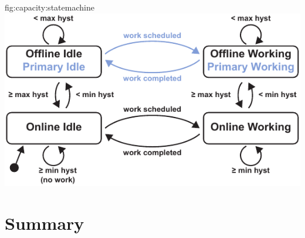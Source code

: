 \begin{definefigure}{fig:capacity:statemachine}
    \centering
    \includegraphics[width=\columnwidth]{figs/capacity/model_state_machine}
    \caption{\normalfont Model state machine.
    A modeled device can be in one of four states: \textsf{Offline Idle},
    \textsf{Online Idle}, \textsf{Online Working}, and \textsf{Offline
    Working}. When a device is \textsf{Offline Idle}, it has run out of energy
    and is off. If a device is \textsf{Online
    Idle}, it is on and in deep sleep, ready to perform work if triggered. If
    triggered, a device moves to \textsf{Online Working}, where it performs a
    portion of a work event.  If a workload is atomic, workload events
    \textit{must} be completed in one \textsf{Online Working} step, without any
    transitions to an offline state.  \textsf{Offline Working} means that while
    working on a non-atomic task, the device ran out of energy, checkpointed,
    and is waiting to harvest more and resume its task.  For devices
    configured with a primary-cell, \textsf{Offline Idle} and \textsf{Offline
    Working} become \textsf{\textcolor{primary-blue}{Primary Idle}} and
    \textsf{\textcolor{primary-blue}{Primary Working}} respectively.  In these
    states, outgoing energy is charged against the primary-cell and the device
    remains online and able to perform work for the life of the primary-cell.
    }
\end{definefigure}





\section{Summary}
